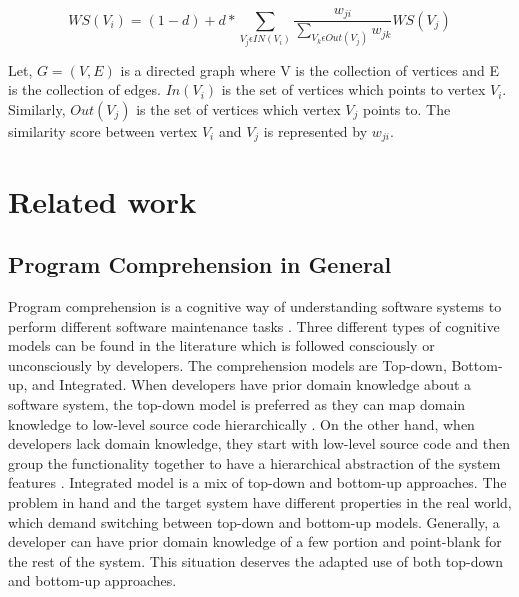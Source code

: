 \begin{equation}
\label{eq:textrank}
    WS(V_i) = (1 - d) + d * \sum_{V_j\epsilon IN(V_i) } \frac{w_{ji}}{\sum_{V_k \epsilon Out(V_j)} w_{jk}}  WS(V_j)
\end{equation}

Let, $ G = (V, E)$ is a directed graph where V is the collection of vertices and E is the collection of edges. $In(V_i)$ is the set of vertices which points to vertex $V_i$. Similarly, $Out(V_j)$ is the set of vertices which vertex $V_j$ points to. The similarity score between vertex $V_i$ and $V_j$ is represented by $w_{ji}$. 


\section{Related work}
\label{background:related_work}
\subsection{Program Comprehension in General}
\label{related:program_comprehension}
Program comprehension is a cognitive way of understanding software systems to perform different software maintenance tasks \cite{wei2002surveyCategorizationComprehension, siegmund2016programPastFuture}. Three different types of cognitive models \cite{tilley1998reverseEngineeringFramework, von1993programToolRequirements, siegmund2016programPastFuture} can be found in the literature which is followed consciously or unconsciously by developers. The comprehension models are Top-down, Bottom-up, and Integrated. When developers have prior domain knowledge about a software system, the top-down model is preferred as they can map domain knowledge to low-level source code hierarchically \cite{brooks1983theoryComprehensionPrograms}. On the other hand, when developers lack domain knowledge, they start with low-level source code and then group the functionality together to have a hierarchical abstraction of the system features \cite{shneiderman1979syntacticInteractionsModel, pennington1987stimulusMentalRepresentations}. Integrated model \cite{shaft1995relevanceDomainKnowledge, von1993programToolRequirements} is a mix of top-down and bottom-up approaches. The problem in hand and the target system have different properties in the real world, which demand switching between top-down and bottom-up models. Generally, a developer can have prior domain knowledge of a few portion and point-blank for the rest of the system. This situation deserves the adapted use of both top-down and bottom-up approaches.   



